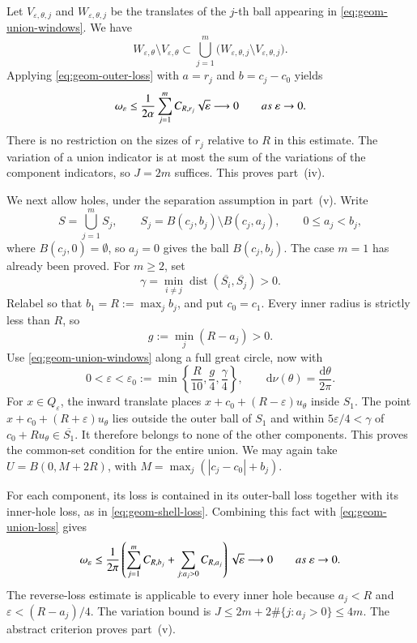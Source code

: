 \documentclass[10pt,a4paper]{amsart}
\def\d{\mathrm{d}}
\newcommand\1{\mathbbm{1}}
\newcommand{\eps}{\varepsilon}
\def\d{\mathrm{d}}
\begin{document}
Let $V_{\eps,\theta,j}$ and $W_{\eps,\theta,j}$ be the translates of the
$j$-th ball appearing in \eqref{eq:geom-union-windows}. We have
\begin{equation}\label{eq:geom-union-loss}
    W_{\eps,\theta}\setminus V_{\eps,\theta}
    \subset
    \bigcup_{j=1}^{m}
    \bigl(W_{\eps,\theta,j}\setminus V_{\eps,\theta,j}\bigr).
\end{equation}
Applying \eqref{eq:geom-outer-loss} with $a=r_j$ and $b=c_j-c_0$ yields
\begin{equation*}
    \omega_\eps
    \le\frac1{2\alpha}\sum_{j=1}^{m}C_{R,r_j}\sqrt{\eps}
    \longrightarrow0\qquad{\rm{as}}\ \eps\to0.
\end{equation*}
There is no restriction on the sizes of $r_j$ relative to $R$ in this estimate.
The variation of a union indicator is at most the sum of the variations of
the component indicators, so $J=2m$ suffices. This proves part~(iv).

We next allow holes, under the separation assumption in part~(v). Write
\begin{equation*}
    S=\bigcup_{j=1}^{m}S_j,\qquad
    S_j=B(c_j,b_j)\setminus B(c_j,a_j),\qquad 0\le a_j<b_j,
\end{equation*}
where $B(c_j,0)=\emptyset$, so $a_j=0$ gives the ball $B(c_j,b_j)$.
The case $m=1$ has already been proved. For $m\ge2$, set
\begin{equation*}
    \gamma=\min_{i\ne j}\operatorname{dist}
       (\overline{S_i},\overline{S_j})>0.
\end{equation*}
Relabel so that $b_1=R:=\max_j b_j$, and put $c_0=c_1$.
Every inner radius is strictly less than $R$, so
\begin{equation*}
    g:=\min_j(R-a_j)>0.
\end{equation*}
Use \eqref{eq:geom-union-windows} along a full great circle, now with
\begin{equation*}
    0<\eps<\eps_0:=\min\left\{\frac R{10},\frac g4,\frac\gamma4\right\},
    \qquad \d\nu(\theta)=\frac{\d\theta}{2\pi}.
\end{equation*}
For $x\in Q_\eps$, the inward translate places
$x+c_0+(R-\eps)u_\theta$ inside $S_1$.
The point $x+c_0+(R+\eps)u_\theta$ lies outside the outer ball of $S_1$
and within $5\eps/4<\gamma$ of $c_0+Ru_\theta\in\overline{S_1}$.
It therefore belongs to none of the other components.
This proves the common-set condition for the entire union.
We may again take $U=B(0,M+2R)$, with
$M=\max_j(|c_j-c_0|+b_j)$.

For each component, its loss is contained in its outer-ball loss together
with its inner-hole loss, as in \eqref{eq:geom-shell-loss}.
Combining this fact with \eqref{eq:geom-union-loss} gives
\begin{equation*}
    \omega_\eps
    \le\frac1{2\pi}\left(
        \sum_{j=1}^{m}C_{R,b_j}
        +\sum_{j:a_j>0}C_{R,a_j}\right)\sqrt{\eps}
    \longrightarrow0\qquad{\rm{as}}\ \eps\to0.
\end{equation*}
The reverse-loss estimate is applicable to every inner hole because
$a_j<R$ and $\eps<(R-a_j)/4$. The variation bound is
$J\le2m+2\#\{j:a_j>0\}\le4m$.
The abstract criterion proves part~(v).
\end{document}
